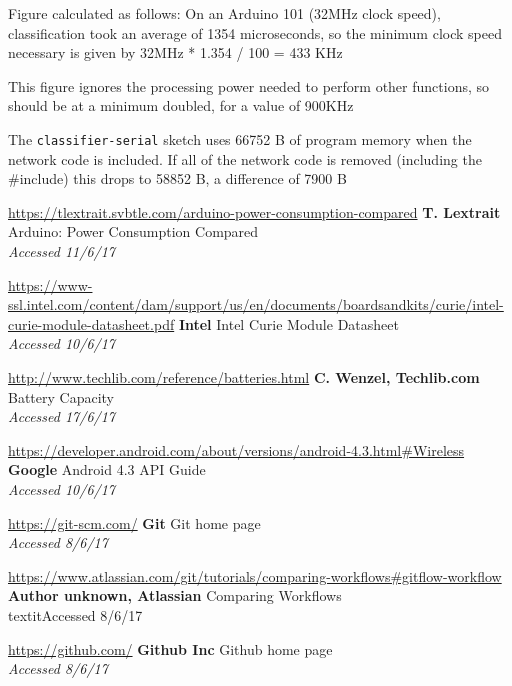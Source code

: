 \documentclass[a4paper]{article}
\begin{document}
\begin{thebibliography}{9}

Figure calculated as follows: On an Arduino 101 (32MHz clock speed), classification took an average of 1354 microseconds, so the minimum clock speed necessary is given by 32MHz * 1.354 / 100 = 433 KHz

This figure ignores the processing power needed to perform other functions, so should be at a minimum doubled, for a value of 900KHz

The \lstinline{classifier-serial} sketch uses 66752 B of program memory when the network code is included. If all of the network code is removed (including the \#include) this drops to 58852 B, a difference of 7900 B

\url{https://tlextrait.svbtle.com/arduino-power-consumption-compared}
\textbf{T. Lextrait}
Arduino: Power Consumption Compared
\\\textit{Accessed 11/6/17}

\url{https://www-ssl.intel.com/content/dam/support/us/en/documents/boardsandkits/curie/intel-curie-module-datasheet.pdf}
\textbf{Intel}
Intel Curie Module Datasheet
\\\textit{Accessed 10/6/17}

\url{http://www.techlib.com/reference/batteries.html}
\textbf{C. Wenzel, Techlib.com}
Battery Capacity
\\\textit{Accessed 17/6/17}

\url{https://developer.android.com/about/versions/android-4.3.html#Wireless}
\textbf{Google}
Android 4.3 API Guide
\\\textit{Accessed 10/6/17}


\url{https://git-scm.com/}
\textbf{Git }
Git home page
\\\textit{Accessed 8/6/17}

\url{https://www.atlassian.com/git/tutorials/comparing-workflows#gitflow-workflow}
\textbf{Author unknown, Atlassian}
Comparing Workflows
\\textit{Accessed 8/6/17}

\url{https://github.com/}
\textbf{Github Inc}
Github home page
\\\textit{Accessed 8/6/17}


\end{thebibliography}
\end{document}
